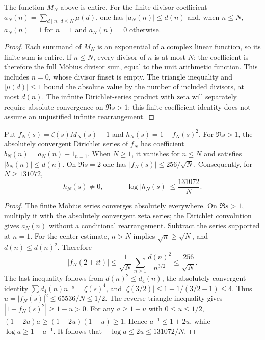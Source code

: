 \begin{lemma}
\label{construction:mollifier-coefficients}
\leanok
The function $M_N$ above is entire.
For the finite divisor coefficient
$a_N(n)=\sum_{d\mid n,\ d\le N}\mu(d)$, one has
$|a_N(n)|\le d(n)$ and, when $n\le N$,
$a_N(n)=1$ for $n=1$ and $a_N(n)=0$ otherwise.
\end{lemma}
\begin{proof}
Each summand of $M_N$ is an exponential of a complex linear function,
so its finite sum is entire.
If $n\le N$, every divisor of $n$ is at most $N$; the coefficient is
therefore the full M\"obius divisor sum, equal to the unit arithmetic
function.  This includes $n=0$, whose divisor finset is empty.
The triangle inequality and $|\mu(d)|\le1$ bound the absolute value by
the number of included divisors, at most $d(n)$.
The infinite Dirichlet-series product with zeta will separately require
absolute convergence on $\Re s>1$; this finite coefficient identity
does not assume an unjustified infinite rearrangement.
\end{proof}

\begin{lemma}
\label{construction:mollifier-center}
\leanok
Put $f_N(s)=\zeta(s)M_N(s)-1$ and $h_N(s)=1-f_N(s)^2$.
For $\Re s>1$, the absolutely convergent Dirichlet series of $f_N$ has
coefficient $b_N(n)=a_N(n)-1_{n=1}$.
When $N\ge1$, it vanishes for $n\le N$ and satisfies $|b_N(n)|\le d(n)$.
On $\Re s=2$ one has $|f_N(s)|\le256/\sqrt N$.
Consequently, for $N\ge131072$,
\[
 h_N(s)\ne0,
 \qquad -\log|h_N(s)|\le\frac{131072}{N}.
\]
\end{lemma}
\begin{proof}
The finite M\"obius series converges absolutely everywhere.
On $\Re s>1$, multiply it with the absolutely convergent zeta series;
the Dirichlet convolution gives $a_N(n)$ without a conditional
rearrangement.  Subtract the series supported at $n=1$.
For the center estimate, $n>N$ implies $\sqrt n\ge\sqrt N$, and
$d(n)\le d(n)^2$.  Therefore
\[
 |f_N(2+it)|
 \le \frac1{\sqrt N}\sum_{n\ge1}\frac{d(n)^2}{n^{3/2}}
 \le\frac{256}{\sqrt N}.
\]
The last inequality follows from $d(n)^2\le d_4(n)$, the absolutely
convergent identity $\sum d_4(n)n^{-s}=\zeta(s)^4$, and
$|\zeta(3/2)|\le1+1/(3/2-1)\le4$.
Thus $u=|f_N(s)|^2\le65536/N\le1/2$.
The reverse triangle inequality gives $|1-f_N(s)^2|\ge1-u>0$.
For any $a\ge1-u$ with $0\le u\le1/2$,
$(1+2u)a\ge(1+2u)(1-u)\ge1$.
Hence $a^{-1}\le1+2u$, while $\log a\ge1-a^{-1}$.
It follows that $-\log a\le2u\le131072/N$.
\end{proof}

